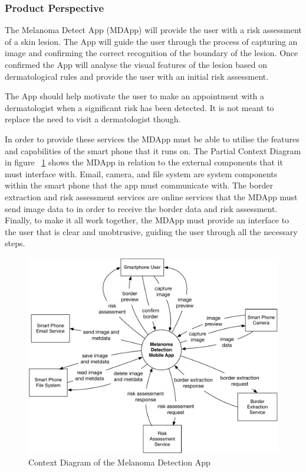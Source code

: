 
        \subsubsection{Product Perspective}

            The Melanoma Detect App (MDApp) will provide the user with a risk assessment of a skin lesion. The App will guide the user through the process of capturing an image and confirming the correct recognition of the boundary of the lesion. Once confirmed the App will analyse the visual features of the lesion based on dermatological rules and provide the user with an initial risk assessment.

    The App should help motivate the user to make an appointment with a dermatologist when a significant risk has been detected. It is not meant to replace the need to visit a dermatologist though.

    In order to provide these services the MDApp must be able to utilise the features and capabilities of the smart phone that it runs on. The Partial Context Diagram in figure ~\ref{fig:partial_feature_tree} shows the MDApp in relation to the external components that it must interface with. Email, camera, and file system are system components within the smart phone that the app must communicate with. The border extraction and risk assessment services are online services that the MDApp must send image data to in order to receive the border data and risk assessment. Finally, to make it all work together, the MDApp must provide an interface to the user that is clear and unobtrusive, guiding the user through all the necessary steps.


            \begin{figure}[H]
                \centering
                \includegraphics[width=\textwidth]{assets/requirements/ContextDiagram.pdf}
                \caption{Context Diagram of the Melanoma Detection App}
                \label{fig:partial_feature_tree}
            \end{figure}


